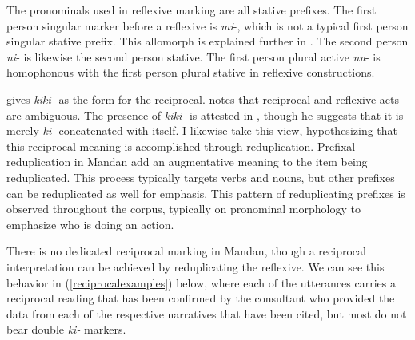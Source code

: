 The pronominals used in reflexive marking are all stative prefixes. The first person singular marker before a reflexive is \textit{mi}-, which is not a typical first person singular stative prefix. This allomorph is explained further in . The second person \textit{ni}- is likewise the second person stative. The first person plural active \textit{nu}- is homophonous with the first person plural stative in reflexive constructions.

\citet[11]{kennard1936} gives \textit{kiki-} as the form for the reciprocal. \citet[440]{hollow1970} notes that reciprocal and reflexive acts are ambiguous. The presence of \textit{kiki-} is attested in \citet[23]{mixco1997a}, though he suggests that it is merely \textit{ki}- concatenated with itself. I likewise take this view, hypothesizing that this reciprocal meaning is accomplished through reduplication. Prefixal reduplication in Mandan add an augmentative meaning to the item being reduplicated. This process typically targets verbs and nouns, but other prefixes can be reduplicated as well for emphasis. This pattern of reduplicating prefixes is observed throughout the corpus, typically on pronominal morphology to emphasize who is doing an action. 

There is no dedicated reciprocal marking in Mandan, though a reciprocal interpretation can be achieved by reduplicating the reflexive. We can see this behavior in (\ref{reciprocalexamples}) below, where each of the utterances carries a reciprocal reading that has been confirmed by the consultant who provided the data from each of the respective narratives that have been cited, but most do not bear double \textit{ki-} markers. 

